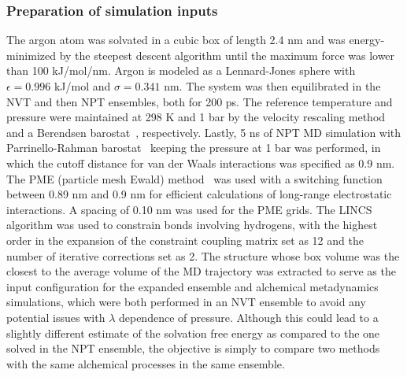 \documentclass[journal=jacsat,manuscript=article]{achemso}
\begin{document}
\subsubsection{Preparation of simulation inputs}
The argon atom was solvated in a cubic box of length 2.4 nm and was energy-minimized by the steepest descent algorithm until the maximum force was lower than 100 kJ/mol/nm. Argon is modeled as a Lennard-Jones sphere with $\epsilon=0.996$ kJ/mol and $\sigma = 0.341$ nm. The system was then equilibrated in the NVT and then NPT ensembles, both for 200 ps. The reference temperature and pressure were maintained at 298 K and 1 bar by the velocity rescaling method~\cite{bussi2007canonical} and a Berendsen barostat~\cite{berendsen1984molecular}, respectively. Lastly, 5 ns of NPT MD simulation with Parrinello-Rahman barostat~\cite{parrinello1980crystal,parrinello1981polymorphic} keeping the pressure at 1 bar was performed, in which the cutoff distance for van der Waals interactions was specified as 0.9 nm. The PME (particle mesh Ewald) method~\cite{essmann1995smooth} was used with a switching function between 0.89 nm and 0.9 nm for efficient calculations of long-range electrostatic interactions. A spacing of 0.10 nm was used for the PME grids. The LINCS~\cite{hess1997lincs} algorithm was used to constrain bonds involving hydrogens, with the highest order in the expansion of the constraint coupling matrix set as 12 and the number of iterative corrections set as 2. The structure whose box volume was the closest to the average volume of the MD trajectory was extracted to serve as the input configuration for the expanded ensemble and alchemical metadynamics simulations, which were both performed in an NVT ensemble to avoid any potential issues with $\lambda$ dependence of pressure. Although this could lead to a slightly different estimate of the solvation free energy as compared to the one solved in the NPT ensemble, the objective is simply to compare two methods with the same alchemical processes in the same ensemble. 
\end{document}
